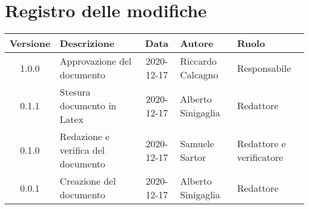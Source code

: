 \section*{Registro delle modifiche}

\begin{center}
	\begin{longtable}{|c|p{3.5cm}|c|p{3cm}|p{3cm}|}
		\hline
		\rowcolor{lighter-grayer}
		\textbf{Versione} & \textbf{Descrizione} & \textbf{Data} & \textbf{Autore} & \textbf{Ruolo} \\
		\hline
		\endfirsthead
		1.0.0 & Approvazione del documento & 2020-12-17 & Riccardo Calcagno & Responsabile \\
		\hline
		0.1.1 & Stesura documento in Latex & 2020-12-17 & Alberto Sinigaglia & Redattore \\
		\hline
		0.1.0 & Redazione e verifica del documento & 2020-12-17 & Samuele Sartor & Redattore e verificatore \\
		\hline
		0.0.1 & Creazione del documento & 2020-12-17 & Alberto Sinigaglia & Redattore \\
		\hline

	\end{longtable}
\end{center}
